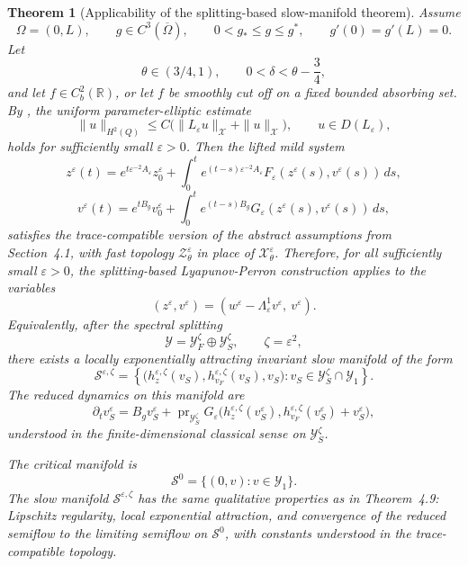 \documentclass[11pt]{article}
\newtheorem{theorem}{Theorem}[section]
\theoremstyle{definition}
\theoremstyle{remark}
\numberwithin{equation}{section}
\newcommand{\mc}[1]{\mathcal{#1}}
\begin{document}
\begin{theorem}[Applicability of the splitting-based slow-manifold theorem]
\label{thm:thin-domain-slow-manifold-application}
Assume
\[
\Omega=(0,L),
\qquad
g\in C^3(\overline\Omega),
\qquad
0<g_*\le g\le g^*,
\qquad
g'(0)=g'(L)=0.
\]
Let
\[
\theta\in(3/4,1),
\qquad
0<\delta<\theta-\frac34,
\]
and let \(f\in C_b^2(\mathbb R)\), or let \(f\) be smoothly cut off on a fixed
bounded absorbing set. 
By , the
uniform parameter-elliptic estimate
\[
\|u\|_{H^2(Q)}
\le
C\bigl(\|L_\varepsilon u\|_{\mc X}+\|u\|_{\mc X}\bigr),
\qquad
u\in D(L_\varepsilon),
\]
holds for sufficiently small \(\varepsilon>0\).
Then the lifted mild system
\[
z^\varepsilon(t)
=
e^{t\varepsilon^{-2}A_\varepsilon}z_0^\varepsilon
+
\int_0^t
e^{(t-s)\varepsilon^{-2}A_\varepsilon}
F_\varepsilon(z^\varepsilon(s),v^\varepsilon(s))\,ds,
\]
\[
v^\varepsilon(t)
=
e^{tB_g}v_0^\varepsilon
+
\int_0^t
e^{(t-s)B_g}
G_\varepsilon(z^\varepsilon(s),v^\varepsilon(s))\,ds,
\]
satisfies the trace-compatible version of the abstract assumptions from
Section~4.1, with fast topology \(\mc Z_\theta^\varepsilon\) in place of
\(\mathcal X_\theta^\varepsilon\). Therefore, for all sufficiently small
\(\varepsilon>0\), the splitting-based Lyapunov-Perron construction applies to
the variables
\[
(z^\varepsilon,v^\varepsilon)
=
(w^\varepsilon-\Lambda_\varepsilon^1v^\varepsilon,\ v^\varepsilon).
\]
Equivalently, after the spectral splitting
\[
\mathcal Y
=
\mathcal Y_F^\zeta\oplus\mathcal Y_S^\zeta,
\qquad
\zeta=\varepsilon^2,
\]
there exists a locally exponentially attracting invariant slow manifold of the
form
\[
\mathcal S^{\varepsilon,\zeta}
=
\left\{
\bigl(
h_z^{\varepsilon,\zeta}(v_S),
h_{v_F}^{\varepsilon,\zeta}(v_S),
v_S
\bigr):
v_S\in \mathcal Y_S^\zeta\cap\mathcal Y_1
\right\}.
\]
The reduced dynamics on this manifold are
\[
\partial_tv_S^\varepsilon
=
B_gv_S^\varepsilon
+
\operatorname{pr}_{\mathcal Y_S^\zeta}
G_\varepsilon
\bigl(
h_z^{\varepsilon,\zeta}(v_S^\varepsilon),
h_{v_F}^{\varepsilon,\zeta}(v_S^\varepsilon)+v_S^\varepsilon
\bigr),
\]
understood in the finite-dimensional classical sense on
\(\mathcal Y_S^\zeta\).

The critical manifold is
\[
\mathcal S^0
=
\{(0,v):v\in\mathcal Y_1\}.
\]
The slow manifold \(\mathcal S^{\varepsilon,\zeta}\) has the same qualitative
properties as in Theorem~4.9: Lipschitz regularity, local exponential
attraction, and convergence of the reduced semiflow to the limiting semiflow on
\(\mathcal S^0\), with constants understood in the trace-compatible topology.
\end{theorem}
\end{document}
